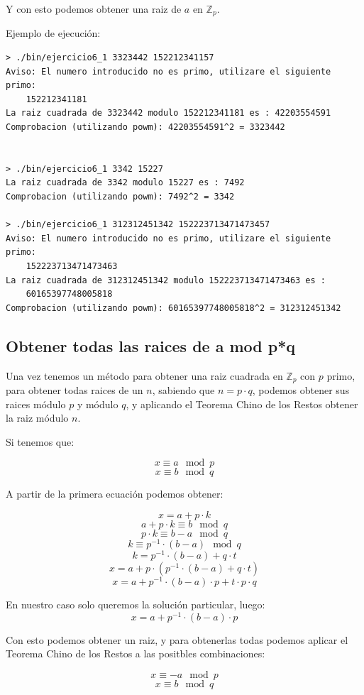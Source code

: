 \documentclass[12pt, spanish]{article}
\begin{document}
Y con esto podemos obtener una raiz de $a$ en $\mathbb{Z}_p$.

Ejemplo de ejecución:

\begin{lstlisting}
> ./bin/ejercicio6_1 3323442 152212341157
Aviso: El numero introducido no es primo, utilizare el siguiente primo:
	152212341181
La raiz cuadrada de 3323442 modulo 152212341181 es : 42203554591
Comprobacion (utilizando powm): 42203554591^2 = 3323442


> ./bin/ejercicio6_1 3342 15227
La raiz cuadrada de 3342 modulo 15227 es : 7492
Comprobacion (utilizando powm): 7492^2 = 3342

> ./bin/ejercicio6_1 312312451342 152223713471473457
Aviso: El numero introducido no es primo, utilizare el siguiente primo:
	152223713471473463
La raiz cuadrada de 312312451342 modulo 152223713471473463 es :
	60165397748005818
Comprobacion (utilizando powm): 60165397748005818^2 = 312312451342
\end{lstlisting}



\subsection{Obtener todas las raices de a mod p*q}

Una vez tenemos un método para obtener una raiz cuadrada en $\mathbb{Z}_p$ con $p$ primo, para obtener todas raices de un $n$, sabiendo que $n = p \cdot q$, podemos obtener sus raices módulo $p$ y módulo $q$, y aplicando el Teorema Chino de los Restos obtener la raiz módulo $n$.

Si tenemos que:

$$x \equiv a \mod p$$
$$x \equiv b \mod q$$

A partir de la primera ecuación podemos obtener:

$$x = a + p \cdot k$$
$$a + p \cdot k \equiv b \mod q$$
$$p \cdot k \equiv b - a \mod q$$
$$k \equiv p^{-1} \cdot (b - a) \mod q$$
$$k = p^{-1} \cdot (b - a) + q \cdot t$$
$$x = a + p \cdot (p^{-1} \cdot (b - a) + q \cdot t )$$
$$x = a + p^{-1} \cdot (b - a) \cdot p + t \cdot p \cdot q$$

En nuestro caso solo queremos la solución particular, luego:
$$x = a + p^{-1} \cdot (b - a) \cdot p$$

Con esto podemos obtener un raiz, y para obtenerlas todas podemos aplicar el Teorema Chino de los Restos a las positbles combinaciones:

$$x \equiv -a \mod p$$
$$x \equiv b \mod q$$
\end{document}
